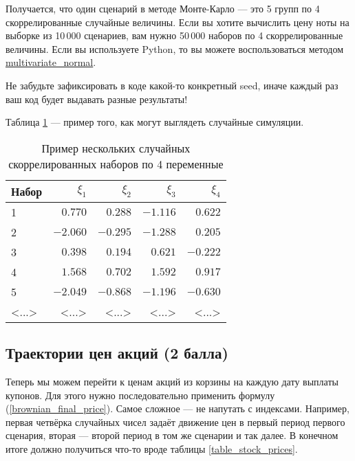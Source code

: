 \documentclass[a4paper,14pt]{extarticle}
\begin{document}
Получается, что один сценарий в методе Монте-Карло --- это 5 групп по 4 
скоррелированные случайные величины. Если вы хотите вычислить цену ноты на 
выборке из 10\,000 сценариев, вам нужно 50\,000 наборов по 4 скоррелированные 
величины. Если вы используете Python, то вы можете воспользоваться методом
\href{https://numpy.org/doc/stable/reference/random/generated/numpy.random.Generator.multivariate\_normal.html}{multivariate\_normal}.

Не забудьте зафиксировать в коде какой-то конкретный seed, иначе каждый раз
ваш код будет выдавать разные результаты!

Таблица \ref{random_sample_table} --- пример того, как могут выглядеть случайные симуляции. 
\begin{table}[h]
\centering
\begin{tabular}{l|r|r|r|r}
Набор & $\xi_1$ & $\xi_2$ & $\xi_3$ & $\xi_4$ \\ \hline
1 & $0.770$ &  $0.288$ & $-1.116$ &  $0.622$ \\
2 &$-2.060$ & $-0.295$ & $-1.288$ &  $0.205$ \\
3 & $0.398$ &  $0.194$ &  $0.621$ & $-0.222$ \\
4 & $1.568$ &  $0.702$ &  $1.592$ &  $0.917$ \\
5 &$-2.049$ & $-0.868$ & $-1.196$ & $-0.630$ \\
<...> & <...> & <...> & <...> & <...>
\end{tabular}
\caption{Пример нескольких случайных скоррелированных наборов по 4 переменные}
\label{random_sample_table}
\end{table}

\subsection{Траектории цен акций (2 балла)}

Теперь мы можем перейти к ценам акций из корзины на каждую дату выплаты купонов.
Для этого нужно последовательно применить формулу (\ref{brownian_final_price}).
Самое сложное --- не напутать с индексами. Например, первая четвёрка случайных
чисел задаёт движение цен в первый период первого сценария, вторая --- второй
период в том же сценарии и так далее. В конечном итоге должно получиться что-то
вроде таблицы \ref{table_stock_prices}.
\end{document}
